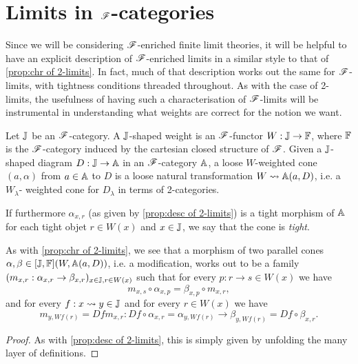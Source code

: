 \documentclass[../thesis.tex]{subfiles}
\begin{document}
\section{Limits in \texorpdfstring{${\mathscr{F}}$}{F}-categories}\label{sec:F limits}
Since we will be considering ${\mathscr{F}}$-enriched finite limit theories, it will be helpful to have an
explicit description of ${\mathscr{F}}$-enriched limits in a similar style to that of \cref{prop:chr of 2-limits}.
In fact, much of that description works out the same for ${\mathscr{F}}$-limits, with tightness conditions
threaded throughout. As with the case of 2-limits, the usefulness of having such a characterisation
of ${\mathscr{F}}$-limits will be instrumental in understanding what weights are correct for the notion we
want.

\begin{proposition}
  Let ${\mathbb{J}}$ be an ${\mathscr{F}}$-category. A ${\mathbb{J}}$-shaped weight is an ${\mathscr{F}}$-functor $W : {\mathbb{J}} \to {\mathbb{F}}$, where
  ${\mathbb{F}}$ is the ${\mathscr{F}}$-category induced by the cartesian closed structure of ${\mathscr{F}}$. Given a ${\mathbb{J}}$-shaped
  diagram $D : {\mathbb{J}} \to {\mathbb{A}}$ in an ${\mathscr{F}}$-category ${\mathbb{A}}$, a loose $W$-weighted cone $(a,\alpha)$
  from $a \in {\mathbb{A}}$ to $D$ is a loose natural transformation $W \rightsquigarrow {\mathbb{A}}(a,D)$, i.e. a $W_\lambda$-%
  weighted cone for $D_\lambda$ in terms of 2-categories.

  If furthermore $\alpha_{x,r}$ (as given by \cref{prop:desc of 2-limits}) is a tight morphism of ${\mathbb{A}}$
  for each tight objet $r \in W(x)$ and $x \in {\mathbb{J}}$, we say that the cone is \emph{tight}. 
  
  As with \cref{prop:chr of 2-limits}, we see that a morphism of two parallel cones $\alpha,\beta \in
  [{\mathbb{J}},{\mathbb{F}}](W,{\mathbb{A}}(a,D))$, i.e. a modification, works out to be a family $(m_{x,r} : \alpha_{x,r} \to
  \beta_{x,r})_{x \in {\mathbb{J}}, r \in W(x)}$ such that for every $p : r \to s \in W(x)$ we have
  \[m_{x,s} \circ \alpha_{x,p} = \beta_{x,p} \circ m_{x,r},\]
  and for every $f : x \rightsquigarrow y \in {\mathbb{J}}$ and for every $r \in W(x)$ we have
  \[m_{y,Wf(r)} = Df m_{x,r} : Df \circ \alpha_{x,r} = \alpha_{y,Wf(r)} \to \beta_{y,Wf(r)}
  = Df \circ \beta_{x,r}.\]
\end{proposition}
\begin{proof}
  As with \cref{prop:desc of 2-limits}, this is simply given by unfolding the many layer of definitions.
\end{proof}
\end{document}
